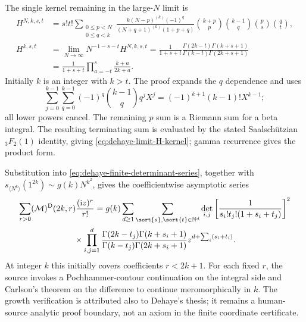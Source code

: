 The single kernel remaining in the large-$N$ limit is
\begin{align}
 H^{N,k,s,t}
 &=s!t!\sum_{\substack{0\leq p<N\\0\leq q<k}}
 \frac{k(N-p)^{(k)}(-1)^q}{(N+q+1)^{(k)}(1+p+q)}
 \binom{k+p}{p}\binom{k-1}{q}\binom ps\binom qt,
 \label{eq:dehaye-finite-H-kernel}\\
 H^{k,s,t}
 &=\lim_{N\to\infty}N^{-1-s-t}H^{N,k,s,t}
 =\frac1{1+s+t}
 \frac{\Gamma(2k-t)\Gamma(k+s+1)}
 {\Gamma(k-t)\Gamma(2k+s+1)}
 \label{eq:dehaye-limit-H-kernel}\\
 &=\frac1{1+s+t}\prod_{a=-t}^{s}\frac{k+a}{2k+a}.
 \label{eq:dehaye-H-rational-product}
\end{align}
Initially $k$ is an integer with $k>t$.  The proof expands the $q$ dependence and
uses
\[
 \sum_{j=0}^{k-1}\sum_{q=0}^{k-1}(-1)^q\binom{k-1}{q}q^jX^j
 =(-1)^{k+1}(k-1)!X^{k-1};
\]
all lower powers cancel.  The remaining $p$ sum is a Riemann sum for a beta integral.
The resulting terminating sum is evaluated by the stated Saalsch\"utzian
${}_3F_2(1)$ identity, giving \eqref{eq:dehaye-limit-H-kernel}; gamma recurrence
gives the product form.

Substitution into \eqref{eq:dehaye-finite-determinant-series}, together with
$s_{\langle N^k\rangle}(1^{2k})\sim g(k)N^{k^2}$, gives the coefficientwise
asymptotic series
\begin{multline}
 \sum_{r>0}(\mathcal M)^{\mathrm D}(2k,r)\frac{(\mathrm iz)^r}{r!}
 =g(k)\sum_{d\geq1}
 \sum_{\sort{s},\sort{t}\in\mathbb N^d}
 \det_{i,j}\left[\frac1{s_i!t_j!(1+s_i+t_j)}\right]^2\\
 {}\times\prod_{i,j=1}^{d}
 \frac{\Gamma(2k-t_j)\Gamma(k+s_i+1)}
 {\Gamma(k-t_j)\Gamma(2k+s_i+1)}
 z^{d+\sum_i(s_i+t_i)}.
 \label{eq:dehaye-asymptotic-determinant-series}
\end{multline}
At integer $k$ this initially covers coefficients $r<2k+1$.  For each fixed $r$,
the source invokes a Pochhammer-contour continuation on the integral side and
Carlson's theorem on the difference to continue meromorphically in $k$.  The
growth verification is attributed also to Dehaye's thesis; it remains a human-source
analytic proof boundary, not an axiom in the finite coordinate certificate.

